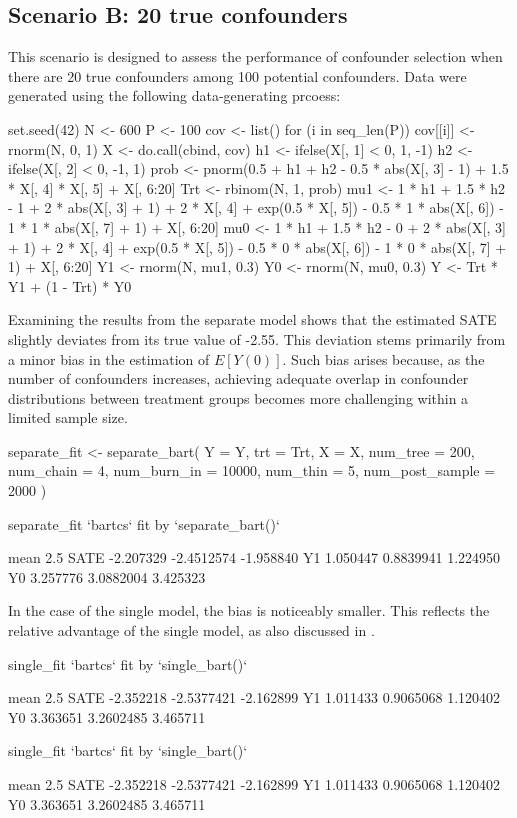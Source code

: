 \subsection*{Scenario B: 20 true confounders}
This scenario is designed to assess the performance of confounder selection when there are 20 true confounders among 100 potential confounders. Data were generated using the following data-generating prcoess:
\begin{example}
set.seed(42)
N <- 600
P <- 100
cov <- list()
for (i in seq_len(P)) {
  cov[[i]] <- rnorm(N, 0, 1)
}
X <- do.call(cbind, cov)
h1 <- ifelse(X[, 1] < 0, 1, -1)
h2 <- ifelse(X[, 2] < 0, -1, 1)
prob <- pnorm(0.5 + h1 + h2 - 0.5 * abs(X[, 3] - 1) +
                1.5 * X[, 4] * X[, 5] + X[, 6:20] %
Trt <- rbinom(N, 1, prob)
mu1 <- 1 * h1 + 1.5 * h2 - 1 + 2 * abs(X[, 3] + 1) + 2 * X[, 4] + exp(0.5 * X[, 5]) -
  0.5 * 1 * abs(X[, 6]) - 1 * 1 * abs(X[, 7] + 1) + X[, 6:20] %
mu0 <- 1 * h1 + 1.5 * h2 - 0 + 2 * abs(X[, 3] + 1) + 2 * X[, 4] + exp(0.5 * X[, 5]) -
  0.5 * 0 * abs(X[, 6]) - 1 * 0 * abs(X[, 7] + 1) + X[, 6:20] %
Y1 <- rnorm(N, mu1, 0.3)
Y0 <- rnorm(N, mu0, 0.3)
Y <- Trt * Y1 + (1 - Trt) * Y0
\end{example}
Examining the results from the separate model shows that the estimated SATE slightly deviates from its true value of -2.55. This deviation stems primarily from a minor bias in the estimation of \(E[Y(0)]\). Such bias arises because, as the number of confounders increases, achieving adequate overlap in confounder distributions between treatment groups becomes more challenging within a limited sample size.
\begin{example}
separate_fit <- separate_bart(
     Y = Y, trt = Trt, X = X, num_tree = 200, num_chain = 4,
     num_burn_in = 10000, num_thin = 5, num_post_sample = 2000
)

separate_fit
`bartcs` fit by `separate_bart()`

          mean       2.5%
SATE -2.207329 -2.4512574 -1.958840
Y1    1.050447  0.8839941  1.224950
Y0    3.257776  3.0882004  3.425323
\end{example}
In the case of the single model, the bias is noticeably smaller. This reflects the relative advantage of the single model, as also discussed in \cite{kim2023bnp}.
\begin{example}
single_fit
`bartcs` fit by `single_bart()`

          mean       2.5%
SATE -2.352218 -2.5377421 -2.162899
Y1    1.011433  0.9065068  1.120402
Y0    3.363651  3.2602485  3.465711

single_fit
`bartcs` fit by `single_bart()`

          mean       2.5%
SATE -2.352218 -2.5377421 -2.162899
Y1    1.011433  0.9065068  1.120402
Y0    3.363651  3.2602485  3.465711
\end{example}

